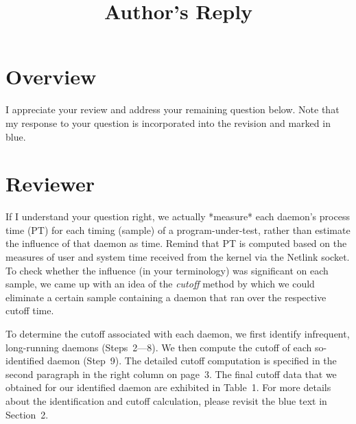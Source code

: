 \documentclass[10pt,letterpaper]{article}
\newenvironment{myindentpar}[1]%
{\begin{list}{}
         {\vspace{10pt}
					\setlength{\leftmargin}{#1}}
          \item[]
}
{\end{list}}
\newcommand{\rev}[1]{\begin{myindentpar}{.25in} {\em {\color{blue}{#1}}}\end{myindentpar}}
\begin{document}
\title{Author's Reply}
\author{}
\maketitle

\section*{Overview}\label{sec:overview}
I appreciate your review and address your remaining question below. 
Note that my response to your question is 
incorporated into the revision and marked in {\color{blue}blue}.


\clearpage
\section*{Reviewer}\label{sec:rev1}

\rev{
$<<$ Reviewer's comments to the author(s) $>>$

The manuscript is well revised.

However, I have a question how to estimate each daemon's influence as time.
The estimation is important for accuracy of your proposed method.

For acceptance, please clarify the estimation method and its validity.

}

If I understand your question right, 
we actually *measure* each daemon's process time (PT) for each timing (sample) of a program-under-test, 
rather than estimate the influence of that daemon as time. 
Remind that PT is computed based on the measures of user and system time received from the kernel via 
the Netlink socket. To check whether the influence (in your terminology) was significant on each sample, 
we came up with an idea of the {\em cutoff} method by 
which we could eliminate a certain sample containing a daemon that ran over the respective cutoff time. 

To determine the cutoff associated with each daemon, we first identify infrequent, long-running daemons (\hbox{Steps~2---8}). 
We then compute the cutoff of each so-identified daemon (Step~9). 
The detailed cutoff computation is specified in the second paragraph in the right column on page~3. 
The final cutoff data that we obtained for our identified daemon are exhibited in Table~1. 
For more details about the identification and cutoff calculation, please revisit the blue text in Section~2. 
\end{document}
